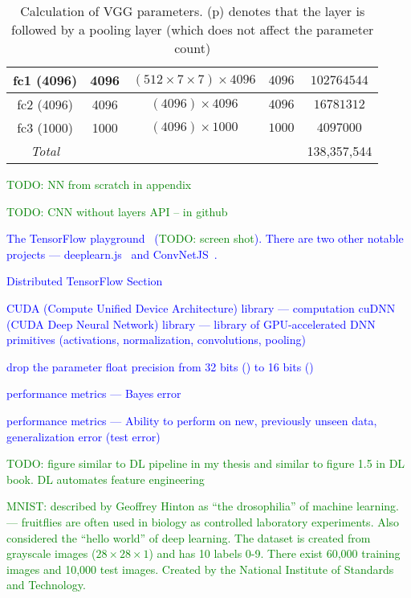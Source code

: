 \begin{table}
\begin{tabular}{|c|c|c|c|c|}
		fc1 (4096)        & 4096 &$(512\times7\times7)\times4096$ & $4096$ & $102764544$    \\ \hline
		fc2 (4096)        & 4096 &$(4096)\times4096$ & $4096$ & $16781312$    \\ \hline
		fc3 (1000)        & 1000 &$(4096)\times1000$ & $1000$ & $4097000$    \\ \hline
		\emph{Total} & & & & 138,357,544 \\ \hline
	\end{tabular}
	\caption{Calculation of VGG parameters. (p) denotes that the layer is followed by a pooling layer (which does not affect the parameter count)}
	\label{tab:vgg_parameter_count}
\end{table}




\textcolor{green}{TODO: NN from scratch in appendix}

\textcolor{green}{TODO: CNN without layers API -- in github}

\textcolor{blue}{The TensorFlow playground~\cite{tf_playground} (\textcolor{green}{TODO: screen shot}).  There are two other notable projects --- deeplearn.js~\cite{deeplearnjs} and ConvNetJS~\cite{convnet_js}.}


\textcolor{blue}{Distributed TensorFlow Section}


\textcolor{blue}{CUDA (Compute Unified Device Architecture) library --- computation}
\textcolor{blue}{cuDNN (CUDA Deep Neural Network) library --- library of GPU-accelerated DNN primitives (activations, normalization, convolutions, pooling)}


\textcolor{blue}{drop the parameter float precision from 32 bits () to 16 bits ()}

\textcolor{blue}{performance metrics --- Bayes error}

\textcolor{blue}{performance metrics --- Ability to perform on new, previously unseen data, generalization error (test error)}


\textcolor{green}{TODO: figure similar to DL pipeline in my thesis and similar to figure 1.5 in DL book. DL automates feature engineering}


\textcolor{green}{MNIST: described by Geoffrey Hinton as ``the drosophilia'' of machine learning. --- fruitflies are often used in biology as controlled laboratory experiments. Also considered the ``hello world'' of deep learning. The dataset is created from grayscale images ($28 \times 28 \times 1$) and has 10 labels 0-9.  There exist 60,000 training images and 10,000 test images. Created by the National Institute of Standards and Technology.}


